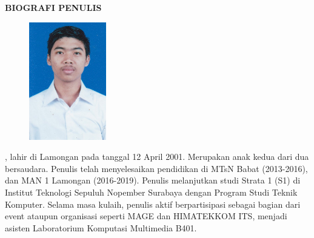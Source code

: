 \begin{center}
  \Large
  \textbf{BIOGRAFI PENULIS}
\end{center}


\vspace{2ex}

\begin{figure}
  \centering
  \vspace{-3ex}
  \includegraphics[width=0.3\textwidth]{../Gambar/alfan.jpg}
  \vspace{-4ex}
\end{figure}

\name{}, lahir di Lamongan pada tanggal 12 April 2001. Merupakan anak kedua dari dua bersaudara. Penulis telah menyelesaikan pendidikan di MTsN Babat (2013-2016), dan MAN 1 Lamongan (2016-2019). Penulis melanjutkan studi Strata 1 (S1) di Institut Teknologi Sepuluh Nopember Surabaya dengan Program Studi Teknik Komputer. Selama masa kulaih, penulis aktif berpartisipasi sebagai bagian dari event ataupun organisasi seperti MAGE dan HIMATEKKOM ITS, menjadi asisten Laboratorium Komputasi Multimedia B401.
